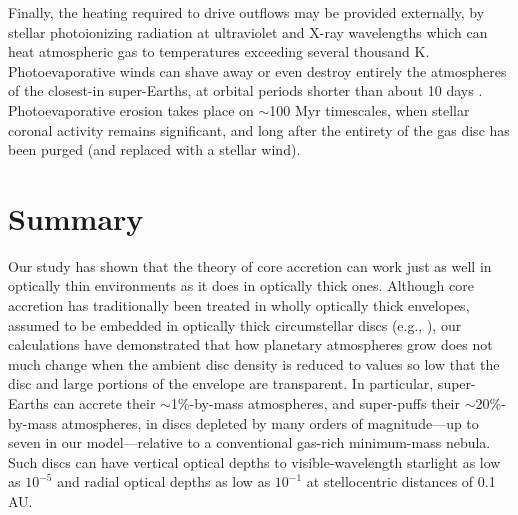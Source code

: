 \documentclass[fleqn,useAMS,usenatbib]{mnras}
\begin{document}
Finally, the heating required to drive outflows may be provided
externally, by stellar photoionizing radiation at ultraviolet and
X-ray wavelengths which can heat atmospheric gas to temperatures
exceeding several thousand K.  Photoevaporative winds can shave away
or even destroy entirely the atmospheres of the closest-in
super-Earths, at orbital periods shorter than about 10 days
\citep{owen13,owen17, fulton17}.  Photoevaporative erosion takes place
on $\sim$100 Myr timescales, when stellar coronal activity remains
significant, and long after the entirety of the gas disc has been
purged (and replaced with a stellar wind).

\section{Summary}
\label{sec:conclusions}

Our study has shown that the theory of core accretion
can work just as well in optically thin environments
as it does in optically thick ones. Although core accretion
has traditionally been treated in wholly optically thick envelopes,
assumed to be embedded
in optically thick circumstellar discs (e.g., \citealt{pollack96}),
our calculations have demonstrated that how planetary atmospheres
grow does not much change when the
ambient disc density is reduced to values so low
that the disc and large portions of the envelope
are transparent. In particular,
super-Earths can accrete their $\sim$1\%-by-mass
atmospheres, and super-puffs their $\sim$20\%-by-mass
atmospheres, in discs depleted by many orders of magnitude---up to
seven in our model---relative to a conventional gas-rich
minimum-mass nebula. Such discs
can have vertical optical depths to visible-wavelength
starlight as low as $10^{-5}$ and radial optical
depths as low as $10^{-1}$ at stellocentric
distances of 0.1 AU.
\end{document}
